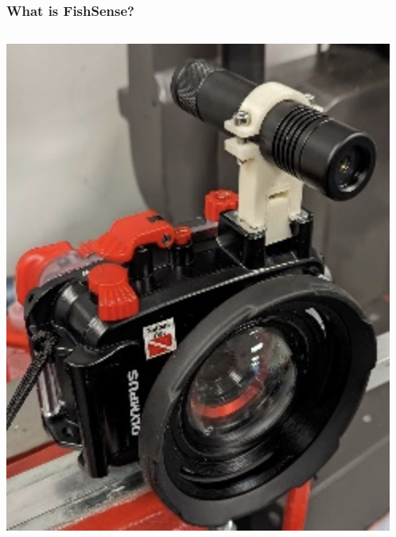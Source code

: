 \begin{frame}
    \frametitle{What is FishSense?}
    
    \begin{columns}[T] 
        \begin{column}{0.25\textwidth}
            \centering
            \includegraphics[width=\linewidth, keepaspectratio]{images/fishsenselite.png}
        \end{column}
        

\end{columns}
\end{frame}
